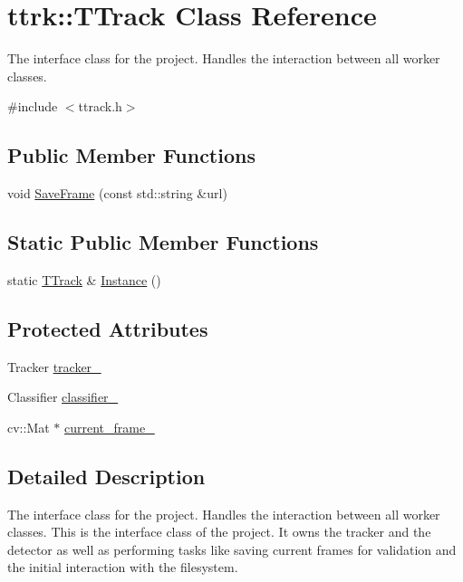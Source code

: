 \hypertarget{classttrk_1_1TTrack}{
\section{ttrk::TTrack Class Reference}
\label{classttrk_1_1TTrack}
}


The interface class for the project. Handles the interaction between all worker classes.  




{\ttfamily \#include $<$ttrack.h$>$}

\subsection*{Public Member Functions}
\begin{DoxyCompactItemize}
\item 
void \hyperlink{classttrk_1_1TTrack_a1422dc0542f92ad9aaa38070e0b70b12}{SaveFrame} (const std::string \&url)
\end{DoxyCompactItemize}
\subsection*{Static Public Member Functions}
\begin{DoxyCompactItemize}
\item 
static \hyperlink{classttrk_1_1TTrack}{TTrack} \& \hyperlink{classttrk_1_1TTrack_a30e95dca9107f05cfbed077d66641e55}{Instance} ()
\end{DoxyCompactItemize}
\subsection*{Protected Attributes}
\begin{DoxyCompactItemize}
\item 
Tracker \hyperlink{classttrk_1_1TTrack_a6d7c76c7b81abdd52965acd500feec53}{tracker\_\-}
\item 
Classifier \hyperlink{classttrk_1_1TTrack_a0ee6c4dee1ee39cd387f847be0336381}{classifier\_\-}
\item 
cv::Mat $\ast$ \hyperlink{classttrk_1_1TTrack_a1b376079d9dbf9ef143d64fff627fcc1}{current\_\-frame\_\-}
\end{DoxyCompactItemize}


\subsection{Detailed Description}
The interface class for the project. Handles the interaction between all worker classes. This is the interface class of the project. It owns the tracker and the detector as well as performing tasks like saving current frames for validation and the initial interaction with the filesystem. 

